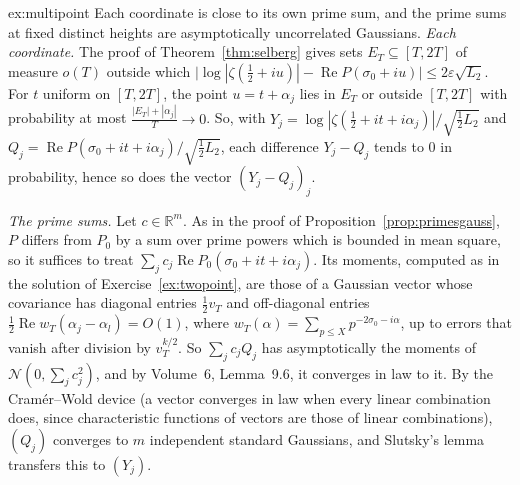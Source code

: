 \begin{solution}{ex:multipoint}
\idea Each coordinate is close to its own prime sum, and the prime sums at fixed distinct heights are asymptotically uncorrelated Gaussians.
\writeup \emph{Each coordinate.} The proof of Theorem~\ref{thm:selberg} gives sets $E_T\subseteq[T,2T]$ of measure $o(T)$ outside which $\bigl|\log|\zeta(\frac12+iu)|-\operatorname{Re}P(\sigma_0+iu)\bigr|\le2\varepsilon\sqrt{L_2}$. For $t$ uniform on $[T,2T]$, the point $u=t+\alpha_j$ lies in $E_T$ or outside $[T,2T]$ with probability at most $\frac{|E_T|+|\alpha_j|}T\to0$. So, with $Y_j=\log|\zeta(\frac12+it+i\alpha_j)|/\sqrt{\frac12L_2}$ and $Q_j=\operatorname{Re}P(\sigma_0+it+i\alpha_j)/\sqrt{\frac12L_2}$, each difference $Y_j-Q_j$ tends to $0$ in probability, hence so does the vector $(Y_j-Q_j)_j$.

\emph{The prime sums.} Let $c\in\mathbb R^m$. As in the proof of Proposition~\ref{prop:primesgauss}, $P$ differs from $P_0$ by a sum over prime powers which is bounded in mean square, so it suffices to treat $\sum_jc_j\operatorname{Re}P_0(\sigma_0+it+i\alpha_j)$. Its moments, computed as in the solution of Exercise~\ref{ex:twopoint}, are those of a Gaussian vector whose covariance has diagonal entries $\frac12v_T$ and off-diagonal entries $\frac12\operatorname{Re}w_T(\alpha_j-\alpha_l)=O(1)$, where $w_T(\alpha)=\sum_{p\le X}p^{-2\sigma_0-i\alpha}$, up to errors that vanish after division by $v_T^{k/2}$. So $\sum_jc_jQ_j$ has asymptotically the moments of $\mathcal N(0,\sum_jc_j^2)$, and by Volume~6, Lemma~9.6, it converges in law to it. By the Cramér--Wold device (a vector converges in law when every linear combination does, since characteristic functions of vectors are those of linear combinations), $(Q_j)$ converges to $m$ independent standard Gaussians, and Slutsky's lemma transfers this to $(Y_j)$.
\end{solution}

